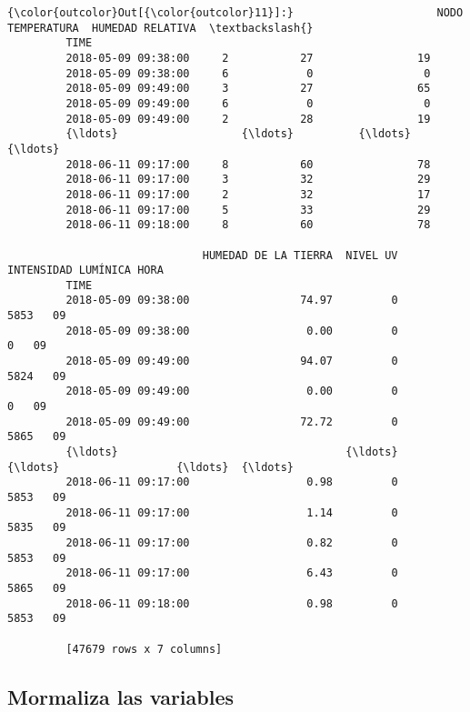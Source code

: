 \documentclass[11pt]{article}
\begin{document}
\begin{Verbatim}[commandchars=\\\{\}]
{\color{outcolor}Out[{\color{outcolor}11}]:}                      NODO  TEMPERATURA  HUMEDAD RELATIVA  \textbackslash{}
         TIME                                                       
         2018-05-09 09:38:00     2           27                19   
         2018-05-09 09:38:00     6            0                 0   
         2018-05-09 09:49:00     3           27                65   
         2018-05-09 09:49:00     6            0                 0   
         2018-05-09 09:49:00     2           28                19   
         {\ldots}                   {\ldots}          {\ldots}               {\ldots}   
         2018-06-11 09:17:00     8           60                78   
         2018-06-11 09:17:00     3           32                29   
         2018-06-11 09:17:00     2           32                17   
         2018-06-11 09:17:00     5           33                29   
         2018-06-11 09:18:00     8           60                78   
         
                              HUMEDAD DE LA TIERRA  NIVEL UV  INTENSIDAD LUMÍNICA HORA  
         TIME                                                                           
         2018-05-09 09:38:00                 74.97         0                 5853   09  
         2018-05-09 09:38:00                  0.00         0                    0   09  
         2018-05-09 09:49:00                 94.07         0                 5824   09  
         2018-05-09 09:49:00                  0.00         0                    0   09  
         2018-05-09 09:49:00                 72.72         0                 5865   09  
         {\ldots}                                   {\ldots}       {\ldots}                  {\ldots}  {\ldots}  
         2018-06-11 09:17:00                  0.98         0                 5853   09  
         2018-06-11 09:17:00                  1.14         0                 5835   09  
         2018-06-11 09:17:00                  0.82         0                 5853   09  
         2018-06-11 09:17:00                  6.43         0                 5865   09  
         2018-06-11 09:18:00                  0.98         0                 5853   09  
         
         [47679 rows x 7 columns]
\end{Verbatim}
            
    \subsection{Mormaliza las variables}\label{mormaliza-las-variables}
\end{document}
